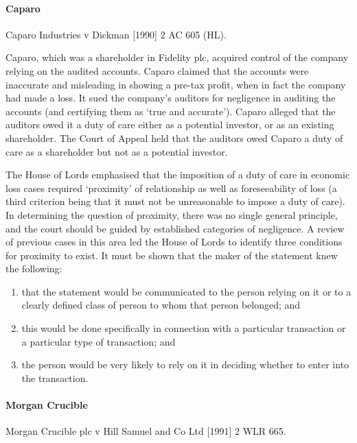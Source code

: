 \documentclass[
]{article}
\providecommand{\tightlist}{%
  \setlength{\itemsep}{0pt}\setlength{\parskip}{0pt}}
\begin{document}
\hypertarget{caparo}{%
\paragraph{Caparo}\label{caparo}}

Caparo Industries v Dickman {[}1990{]} 2 AC 605 (HL).

Caparo, which was a shareholder in Fidelity plc, acquired control of the
company relying on the audited accounts. Caparo claimed that the
accounts were inaccurate and misleading in showing a pre-tax profit,
when in fact the company had made a loss. It sued the company's auditors
for negligence in auditing the accounts (and certifying them as `true
and accurate'). Caparo alleged that the auditors owed it a duty of care
either as a potential investor, or as an existing shareholder. The Court
of Appeal held that the auditors owed Caparo a duty of care as a
shareholder but not as a potential investor.

The House of Lords emphasised that the imposition of a duty of care in
economic loss cases required `proximity' of relationship as well as
foreseeability of loss (a third criterion being that it must not be
unreasonable to impose a duty of care). In determining the question of
proximity, there was no single general principle, and the court should
be guided by established categories of negligence. A review of previous
cases in this area led the House of Lords to identify three conditions
for proximity to exist. It must be shown that the maker of the statement
knew the following:

\begin{enumerate}
\tightlist
\item
  that the statement would be communicated to the person relying on it
  or to a clearly defined class of person to whom that person belonged;
  and
\item
  this would be done specifically in connection with a particular
  transaction or a particular type of transaction; and
\item
  the person would be very likely to rely on it in deciding whether to
  enter into the transaction.
\end{enumerate}

\hypertarget{morgan-crucible}{%
\paragraph{Morgan Crucible}\label{morgan-crucible}}

Morgan Crucible plc v Hill Samuel and Co Ltd {[}1991{]} 2 WLR 665.
\end{document}
